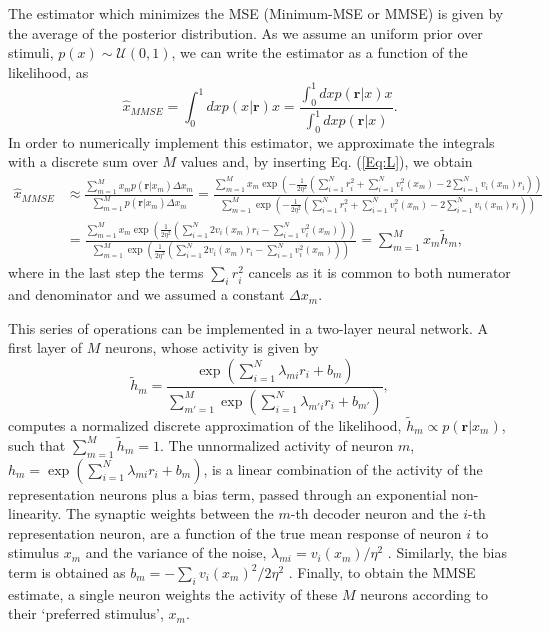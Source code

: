 \documentclass[a4paper]{article}%
\begin{document}
The estimator which minimizes the MSE (Minimum-MSE or MMSE) is given by the
average of the posterior distribution. As we assume an uniform prior over
stimuli, $p(x) \sim\mathcal{U}(0,1)$, we can write the estimator as a function
of the likelihood, as
\begin{equation}
\hat{x}_{MMSE} = \int_{0}^{1} dx p(x| \mathbf{r}) x = \frac{\displaystyle\int%
_{0}^{1} dx p(\mathbf{r}|x)x}{\displaystyle\int_{0}^{1} dx p(\mathbf{r}|x)}.
\label{Eq:dec}%
\end{equation}	In order to numerically implement this estimator, we  approximate the integrals with a discrete sum over $M$ values and, by
inserting Eq. (\ref{Eq:L}), we obtain
\begin{equation}%
\begin{split}
\hat{x}_{MMSE}  &  \approx\frac{\sum_{m=1}^{M} x_{m} p\left(  \mathbf{r}
|x_{m}\right) \Delta x_m  }{\sum_{m=1}^{M} p\left(  \mathbf{r} |x_{m}\right) \Delta x_m   } =
\frac{\sum_{m=1}^{M} x_{m} \exp{\left(  -\frac{1}{2\eta^{2}}\left(\sum_{i=1}^{N}
r_{i}^{2} + \sum_{i=1}^{N} v_{i}^{2} (x_{m}) - 2\sum_{i=1}^{N}v_{i}(x_{m})r_{i} \right)\right)  }}{\sum_{m=1}^{M}
\exp{\left(  -\frac{1}{2\eta^{2}}\left( \sum_{i=1}^{N} r_{i}^{2} + \sum_{i=1}^{N}v_{i}^{2}(x_{m})
- 2\sum_{i=1}^{N}v_{i}(x_{m})r_{i}\right) \right)  }}\\
&  = \frac{\sum_{m=1}^{M} x_{m} \exp{\left(  \frac{1}{2\eta^{2}}\left(\sum_{i=1}^{N}
2v_{i}(x_{m})r_{i} -\sum_{i=1}^{N}v_{i}^{2}(x_{m})\right)\right)  }}{\sum_{m=1}^{M} \exp{\left(
\frac{1}{2\eta^{2}} \left(\sum_{i=1}^{N} 2v_{i}(x_{m})r_{i}-\sum_{i=1}^{N}v_{i}^{2}(x_{m})\right)\right)
}} = \sum_{m=1}^M x_m \tilde h_m,
\end{split}
\end{equation}
where in the last step the terms $\sum_{i} r_{i}^{2} $  cancels as it is
common to both numerator and denominator and we assumed a constant $\Delta x_m$. 

This series of operations can be implemented in a two-layer neural network. A first layer of  $M$ neurons, whose activity is given by 
\begin{equation}\tilde h_m = \frac{\exp{\left(  \sum_{i=1}^{N}
\lambda_{mi}r_{i} + b_{m}\right)  }}{\sum_{m'=1}^M \exp{\left(  \sum_{i=1}^{N}
\lambda_{m'i}r_{i} + b_{m'}\right)  }}, 
\end{equation}
computes a normalized discrete approximation of the likelihood, $ \tilde h_m \propto p(\mathbf{r}|x_m)$, such that $\sum_{m=1}^M \tilde h_m =1$. 
The unnormalized activity of neuron $m$, $h_m =\exp{\left(  \sum_{i=1}^{N}
\lambda_{mi}r_{i} + b_{m}\right)} $, is a linear combination
of the activity of the representation neurons plus a bias term, passed
through an exponential non-linearity. The synaptic weights between the $m$-th
decoder neuron and the $i$-th representation neuron, are a function of the
true mean response of neuron $i$ to stimulus $x_{m}$ and the variance of the
noise, $\lambda_{mi} = v_{i}(x_{m})/\eta^{2}$ . Similarly, the bias term is
obtained as $b_{m} = -\sum_{i} v_{i}(x_{m})^{2}/2\eta^{2}$ .   
Finally, to obtain the MMSE estimate, a single neuron weights the activity of these $M$ neurons according to their  `preferred stimulus', $x_{m}$.
\end{document}
